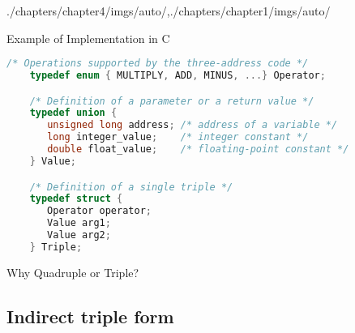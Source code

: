 \begin{graphicspathcontext}{{./chapters/chapter4/imgs/auto/},{./chapters/chapter1/imgs/auto/}}
\begin{bibunit}[apalike]
\begin{frame}[background=6,fragile]{Example of Implementation in C}
	\begin{lstlisting}[language=C,basicstyle=\scriptsize]
	/* Operations supported by the three-address code */
	typedef enum { MULTIPLY, ADD, MINUS, ...} Operator;

	/* Definition of a parameter or a return value */
	typedef union { 
	   unsigned long address; /* address of a variable */
	   long integer_value;    /* integer constant */
	   double float_value;    /* floating-point constant */
	} Value;

	/* Definition of a single triple */
	typedef struct {
	   Operator operator;
	   Value arg1;
	   Value arg2;
	} Triple;
	\end{lstlisting}
\end{frame}

\begin{frame}{Why Quadruple or Triple?}
	\vspace{.25cm}
	\vspace{.25cm}
\end{frame}

\subsection{Indirect triple form}
\subsectiontableofcontentslide


\end{bibunit}
\end{graphicspathcontext}
